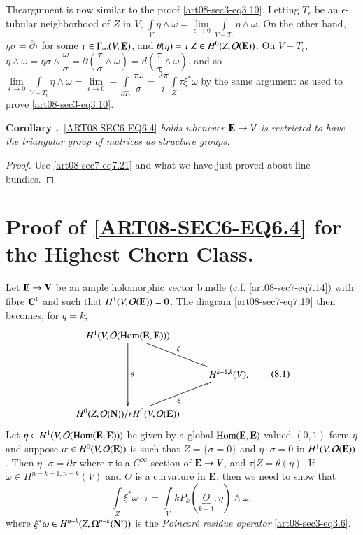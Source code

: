 The\pageoriginale argument is now similar to the proof \eqref{art08-sec3-eq3.10}. Letting $T_{\epsilon}$ be an $\epsilon$-tubular neighborhood of $Z$ in $V$, $\int\limits_{V}\eta\wedge \omega=\lim\limits_{\epsilon\to 0}\int\limits_{V-T_{\epsilon}}\eta\wedge \omega$. On the other hand, $\eta\sigma=\overline{\partial}\tau$ for some $\tau\in \Gamma_{\infty}(V,\mathbf{E})$, and $\theta(\eta)=\tau|Z\in H^{0}(Z,\mathcal{O}(\mathbf{E}))$. On $V-T_{\epsilon}$, $\eta\wedge \omega=\eta\sigma\wedge\dfrac{\omega}{\sigma}=\overline{\partial}\left(\dfrac{\tau}{\sigma}\wedge\omega\right)=d\left(\dfrac{\tau}{\sigma}\wedge\omega\right)$, and so $\lim\limits_{\epsilon\to 0}\int\limits_{V-T_{\epsilon}}\eta\wedge\omega=\lim\limits_{\epsilon\to 0}-\int\limits_{\partial T_{\epsilon}}\dfrac{\tau\omega}{\sigma}=\dfrac{2\pi}{i}\int\limits_{Z}\tau\xi^{*}\omega$ by the same argument as used to prove \eqref{art08-sec3-eq3.10}.

\medskip
\noindent
{\bf Corollary .\label{art08-coro7.27}}~\eqref{ART08-SEC6-EQ6.4} {\em holds whenever $\mathbf{E}\to V$ is restricted to have the triangular group of matrices as structure groups.}


\begin{proof}
Use \eqref{art08-sec7-eq7.21} and what we have just proved about line bundles.
\end{proof}

\section{Proof of \texorpdfstring{\eqref{ART08-SEC6-EQ6.4}}{eq6.4} for the Highest Chern Class.}\label{art08-sec8}

Let $\mathbf{E}\to \mathbf{V}$ be an ample holomorphic vector bundle (c.f. \eqref{art08-sec7-eq7.14}) with fibre $\mathbf{C}^{k}$ and such that $H^{1}(V,\mathcal{O}(\mathbf{E}))=0$. The diagram \eqref{art08-sec7-eq7.19} then becomes, for $q=k$,
\begin{equation*}
\vcenter{\xymatrix{
H^{1}(V,\mathcal{O}(\Hom(\bfE,\bfE)))\ar[dd]^-{\theta}\ar[dr]^-{\zeta}\\
               & H^{k-1,k}(V).\\
H^{0}(Z,\mathcal{O}(\bfN))/rH^{0}(V,\mathcal{O}(\bfE))\ar[ur]_{\xi^{-}} &
}}\tag{8.1}\label{art08-sec8-eq8.1}
\end{equation*}
Let $\eta\in H^{1}(V,\mathcal{O}(\operatorname{\mathrm{Hom}}(\mathbf{E},\mathbf{E})))$ be given by a global $\operatorname{\mathrm{Hom}}(\mathbf{E},\mathbf{E})$-valued $(0,1)$ form $\eta$ and suppose $\sigma\in H^{0}(V,\mathcal{O}(\mathbf{E}))$ is such that $Z=\{\sigma=0\}$ and $\eta\cdot \sigma=0$ in $H^{1}(V,\mathcal{O}(\mathbf{E}))$. Then $\eta\cdot \sigma=\overline{\partial}\tau$ where $\tau$ is a $C^{\infty}$ section of $\mathbf{E}\to V$, and $\tau|Z=\theta(\eta)$. If $\omega\in H^{n-k+1,n-k}(V)$ and $\Theta$ is a curvature in $\mathbf{E}$, then we need to show that
\begin{equation*}
\int\limits_{Z}\xi^{*}\omega\cdot \tau = \int\limits_{V}kP_{k}(\underbrace{\Theta}_{k-1};\eta)\wedge\omega,\tag{8.2}\label{art08-sec8-eq8.2}
\end{equation*}
where $\xi^{*}\omega\in H^{n-k}(Z,\Omega^{n-k}(\mathbf{N}^{*}))$ is the {\em Poincar\'e residue operator} \eqref{art08-sec3-eq3.6}.

